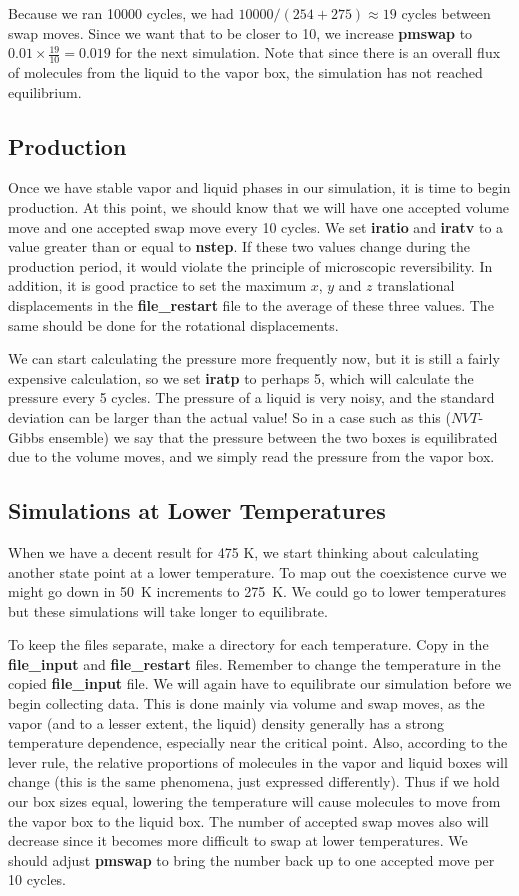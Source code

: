 \documentclass[12pt,letterpaper]{article}
\begin{document}
Because we ran 10000 cycles, we had $10000 / (254 + 275)
\approx 19 $ cycles between swap moves. Since we want that
to be closer to 10, we increase {\bf pmswap} to $0.01 \times
\frac{19}{10} = 0.019$ for the next simulation. Note that
since there is an overall flux of molecules from the liquid
to the vapor box, the simulation has not reached
equilibrium.

\subsection{Production}
Once we have stable vapor and liquid phases in our
simulation, it is time to begin production. At this point,
we should know that we will have one accepted volume move
and one accepted swap move every 10 cycles. We set {\bf
  iratio} and {\bf iratv} to a value greater than or equal
to {\bf nstep}. If these two values change during the
production period, it would violate the principle of
microscopic reversibility. In addition, it is good practice
to set the maximum $x$, $y$ and $z$ translational
displacements in the {\bf file\_restart} file to the average
of these three values. The same should be done for the
rotational displacements.

We can start calculating the pressure more frequently now,
but it is still a fairly expensive calculation, so we set
{\bf iratp} to perhaps 5, which will calculate the pressure
every 5 cycles. The pressure of a liquid is very noisy, and
the standard deviation can be larger than the actual value!
So in a case such as this ($NVT$-Gibbs ensemble) we say that
the pressure between the two boxes is equilibrated due to
the volume moves, and we simply read the pressure from the
vapor box.

\subsection{Simulations at Lower Temperatures}
When we have a decent result for 475 K, we start thinking
about calculating another state point at a lower
temperature. To map out the coexistence curve we might go
down in 50~K increments to 275~K. We could go to lower
temperatures but these simulations will take longer to
equilibrate.

To keep the files separate, make a directory for each
temperature. Copy in the {\bf file\_input} and {\bf
  file\_restart} files. Remember to change the temperature
in the copied {\bf file\_input} file. We will again have to
equilibrate our simulation before we begin collecting data.
This is done mainly via volume and swap moves, as the vapor
(and to a lesser extent, the liquid) density generally has a
strong temperature dependence, especially near the critical
point. Also, according to the lever rule, the relative
proportions of molecules in the vapor and liquid boxes will
change (this is the same phenomena, just expressed
differently). Thus if we hold our box sizes equal, lowering
the temperature will cause molecules to move from the vapor
box to the liquid box. The number of accepted swap moves
also will decrease since it becomes more difficult to swap
at lower temperatures. We should adjust {\bf pmswap} to
bring the number back up to one accepted move per 10 cycles.
\end{document}
